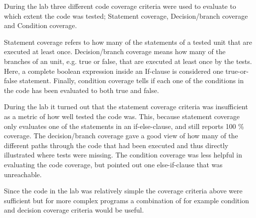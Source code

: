 During the lab three different code coverage criteria were used to evaluate to which extent the code was tested; Statement coverage, Decision/branch coverage and Condition coverage. 

Statement coverage refers to how many of the statements of a tested unit that are executed at least once. Decision/branch coverage means how many of the branches of an unit, e.g. true or false, that are executed at least once by the tests. Here, a complete boolean expression inside an If-clause is considered one true-or-false statement. Finally, condition coverage tells if each one of the conditions in the code has been evaluated to both true and false. 

During the lab it turned out that the statement coverage criteria was insufficient as a metric of how well tested the code was. This, because statement coverage only evaluates one of the statements in an if-else-clause, and still reports 100 \% coverage. The decision/branch coverage gave a good view of how many of the different paths through the code that had been executed and thus directly illustrated where tests were missing. The condition coverage was less helpful in evaluating the code coverage, but pointed out one else-if-clause that was unreachable. 

Since the code in the lab was relatively simple the coverage criteria above were sufficient but for more complex programs a combination of for example condition and decision coverage criteria would be useful. 



